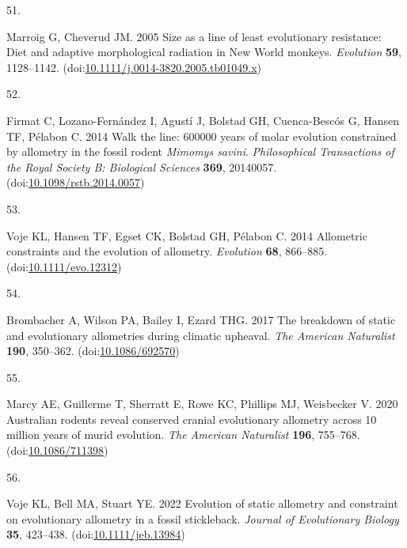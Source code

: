 \documentclass[
  11pt,
]{article}
\newlength{\cslhangindent}
\newlength{\csllabelwidth}
\newlength{\cslentryspacingunit} %
\newenvironment{CSLReferences}[2] %
 {%
  \setlength{\parindent}{0pt}
  \ifodd #1
  \let\oldpar\par
  \def\par{\hangindent=\cslhangindent\oldpar}
  \fi
  \setlength{\parskip}{#2\cslentryspacingunit}
 }%
 {}
\newcommand{\CSLLeftMargin}[1]{\parbox[t]{\csllabelwidth}{#1}}
\newcommand{\CSLRightInline}[1]{\parbox[t]{\linewidth - \csllabelwidth}{#1}\break}
\providecommand{\DIFaddbegin}{} %
\providecommand{\DIFaddend}{} %
\providecommand{\DIFdelbegin}{} %
\providecommand{\DIFdelend}{} %
\newcommand{\DIFscaledelfig}{0.5}
\newlength{\DIFdelgraphicswidth} %
\newlength{\DIFdelgraphicsheight} %
\newcommand{\DIFaddincludegraphics}[2][]{{\color{blue}\fbox{\DIFOincludegraphics[#1]{#2}}}} %
\newcommand{\DIFdelincludegraphics}[2][]{%
\sbox{\DIFdelgraphicsbox}{\DIFOincludegraphics[#1]{#2}}%
\settoboxwidth{\DIFdelgraphicswidth}{\DIFdelgraphicsbox} %
\settoboxtotalheight{\DIFdelgraphicsheight}{\DIFdelgraphicsbox} %
\scalebox{\DIFscaledelfig}{%
\parbox[b]{\DIFdelgraphicswidth}{\usebox{\DIFdelgraphicsbox}\\[-\baselineskip] \rule{\DIFdelgraphicswidth}{0em}}\llap{\resizebox{\DIFdelgraphicswidth}{\DIFdelgraphicsheight}{%
\setlength{\unitlength}{\DIFdelgraphicswidth}%
\begin{picture}(1,1)%
\thicklines\linethickness{2pt} %
{\color[rgb]{1,0,0}\put(0,0){\framebox(1,1){}}}%
{\color[rgb]{1,0,0}\put(0,0){\line( 1,1){1}}}%
{\color[rgb]{1,0,0}\put(0,1){\line(1,-1){1}}}%
\end{picture}%
}\hspace*{3pt}}} %
} %
\DeclareRobustCommand{\DIFaddbegin}{\DIFOaddbegin \let\includegraphics\DIFaddincludegraphics} %
\DeclareRobustCommand{\DIFaddend}{\DIFOaddend \let\includegraphics\DIFOincludegraphics} %
\DeclareRobustCommand{\DIFdelbegin}{\DIFOdelbegin \let\includegraphics\DIFdelincludegraphics} %
\DeclareRobustCommand{\DIFdelend}{\DIFOaddend \let\includegraphics\DIFOincludegraphics} %
\begin{document}
\begin{CSLReferences}{0}{0}
\leavevmode{}%
\CSLLeftMargin{51. }%
\DIFdelbegin %
\DIFdelend \DIFaddbegin \CSLRightInline{Marroig G, Cheverud JM. 2005 Size as a line of least
evolutionary resistance: Diet and adaptive morphological radiation in
{N}ew {W}orld monkeys. \emph{Evolution} \textbf{59}, 1128--1142.
(doi:\href{https://doi.org/10.1111/j.0014-3820.2005.tb01049.x}{10.1111/j.0014-3820.2005.tb01049.x})}
\DIFaddend 

\leavevmode{}%
\CSLLeftMargin{52. }%
\CSLRightInline{Firmat C, Lozano-Fernández I, Agustí J, Bolstad GH,
Cuenca-Bescós G, Hansen TF, Pélabon C. 2014 Walk the line: 600000 years
of molar evolution constrained by allometry in the fossil rodent
\emph{{M}imomys savini}. \emph{Philosophical Transactions of the Royal
Society B: Biological Sciences} \textbf{369}, 20140057.
(doi:\href{https://doi.org/10.1098/rstb.2014.0057}{10.1098/rstb.2014.0057})}

\leavevmode{}%
\CSLLeftMargin{53. }%
\CSLRightInline{Voje KL, Hansen TF, Egset CK, Bolstad GH, Pélabon C.
2014 Allometric constraints and the evolution of allometry.
\emph{Evolution} \textbf{68}, 866--885.
(doi:\href{https://doi.org/10.1111/evo.12312}{10.1111/evo.12312})}

\leavevmode{}%
\CSLLeftMargin{54. }%
\CSLRightInline{Brombacher A, Wilson PA, Bailey I, Ezard THG. 2017 The
breakdown of static and evolutionary allometries during climatic
upheaval. \emph{The American Naturalist} \textbf{190}, 350--362.
(doi:\href{https://doi.org/10.1086/692570}{10.1086/692570})}

\leavevmode{}%
\CSLLeftMargin{55. }%
\CSLRightInline{Marcy AE, Guillerme T, Sherratt E, Rowe KC, Phillips MJ,
Weisbecker V. 2020 Australian rodents reveal conserved cranial
evolutionary allometry across 10 million years of murid evolution.
\emph{The American Naturalist} \textbf{196}, 755--768.
(doi:\href{https://doi.org/10.1086/711398}{10.1086/711398})}

\leavevmode{}%
\CSLLeftMargin{56. }%
\CSLRightInline{Voje KL, Bell MA, Stuart YE. 2022 Evolution of static
allometry and constraint on evolutionary allometry in a fossil
stickleback. \emph{Journal of Evolutionary Biology} \textbf{35},
423--438.
(doi:\href{https://doi.org/10.1111/jeb.13984}{10.1111/jeb.13984})}


\end{CSLReferences}
\end{document}
